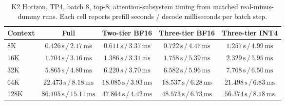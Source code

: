 \begin{table}[t]
\centering
\small
\caption{K2 Horizon, TP4, batch 8, top-8: attention-subsystem timing from matched real-minus-dummy runs. Each cell reports prefill seconds / decode milliseconds per batch step.}
\label{tab:prolong-k2-horizon-tp4-b8-attention-core}
\begin{tabular}{lcccc}
\toprule
Context & Full & Two-tier BF16 & Three-tier BF16 & Three-tier INT4 \\
\midrule
8K & \(0.426\,\mathrm{s}\,/\,2.17\,\mathrm{ms}\) & \(0.611\,\mathrm{s}\,/\,3.37\,\mathrm{ms}\) & \(0.722\,\mathrm{s}\,/\,4.47\,\mathrm{ms}\) & \(1.257\,\mathrm{s}\,/\,4.99\,\mathrm{ms}\) \\
16K & \(1.704\,\mathrm{s}\,/\,3.16\,\mathrm{ms}\) & \(1.386\,\mathrm{s}\,/\,3.31\,\mathrm{ms}\) & \(1.758\,\mathrm{s}\,/\,5.39\,\mathrm{ms}\) & \(2.329\,\mathrm{s}\,/\,5.95\,\mathrm{ms}\) \\
32K & \(5.865\,\mathrm{s}\,/\,4.80\,\mathrm{ms}\) & \(6.220\,\mathrm{s}\,/\,3.70\,\mathrm{ms}\) & \(6.582\,\mathrm{s}\,/\,5.96\,\mathrm{ms}\) & \(7.768\,\mathrm{s}\,/\,6.50\,\mathrm{ms}\) \\
64K & \(22.473\,\mathrm{s}\,/\,8.18\,\mathrm{ms}\) & \(18.085\,\mathrm{s}\,/\,3.93\,\mathrm{ms}\) & \(18.537\,\mathrm{s}\,/\,6.28\,\mathrm{ms}\) & \(21.498\,\mathrm{s}\,/\,6.83\,\mathrm{ms}\) \\
128K & \(86.105\,\mathrm{s}\,/\,15.11\,\mathrm{ms}\) & \(47.864\,\mathrm{s}\,/\,4.42\,\mathrm{ms}\) & \(48.573\,\mathrm{s}\,/\,6.73\,\mathrm{ms}\) & \(56.374\,\mathrm{s}\,/\,8.18\,\mathrm{ms}\) \\
\bottomrule
\end{tabular}
\end{table}

